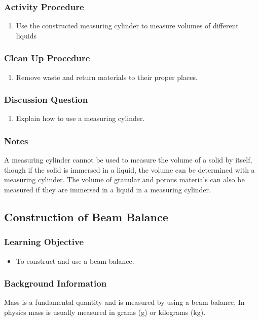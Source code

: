 \subsubsection*{Activity Procedure}
\begin{enumerate}
\item{Use the constructed measuring cylinder to measure volumes of different liquids}
\end{enumerate}

\subsubsection*{Clean Up Procedure}
\begin{enumerate}
\item{Remove waste and return materials to their proper places.}
\end{enumerate}

\subsubsection*{Discussion Question}
\begin{enumerate}
\item{Explain how to use a measuring cylinder.}
\end{enumerate}

\subsubsection*{Notes}
A measuring cylinder cannot be used to measure the volume of a solid by itself, though if the solid is immersed in a liquid, the volume can be determined with a measuring cylinder. The volume of granular and porous materials can also be measured if they are immersed in a liquid in a measuring cylinder.

\subsection{Construction of Beam Balance}

\subsubsection*{Learning Objective}
\begin{itemize}
\item{To construct and use a beam balance.} 
\end{itemize}

\subsubsection*{Background Information}
Mass is a fundamental quantity and is measured by using a beam balance. In physics mass is usually measured in grams (g) or kilograms (kg).

